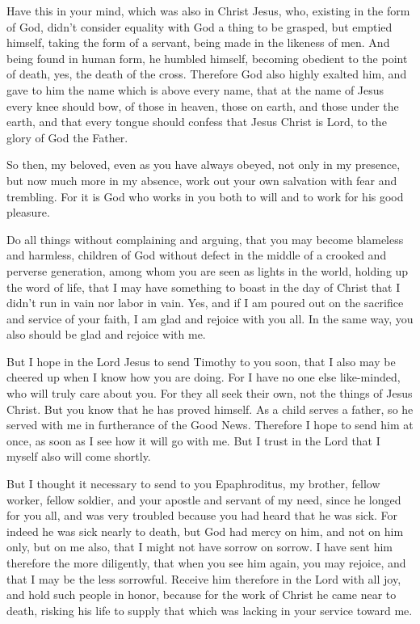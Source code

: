  Have this in your mind, which was also in Christ Jesus,
 who, existing in the form of God, didn't consider equality
with God a thing to be grasped,  but emptied himself, taking
the form of a servant, being made in the likeness of men. 
And being found in human form, he humbled himself, becoming obedient to
the point of death, yes, the death of the cross.  Therefore
God also highly exalted him, and gave to him the name which is above
every name,  that at the name of Jesus every knee should
bow, of those in heaven, those on earth, and those under the earth,
 and that every tongue should confess that Jesus Christ is
Lord, to the glory of God the Father.

 So then, my beloved, even as you have always obeyed, not
only in my presence, but now much more in my absence, work out your own
salvation with fear and trembling.  For it is God who works
in you both to will and to work for his good pleasure.

 Do all things without complaining and arguing,
 that you may become blameless and harmless, children of
God without defect in the middle of a crooked and perverse generation,
among whom you are seen as lights in the world,  holding up
the word of life, that I may have something to boast in the day of
Christ that I didn't run in vain nor labor in vain.  Yes,
and if I am poured out on the sacrifice and service of your faith, I am
glad and rejoice with you all.  In the same way, you also
should be glad and rejoice with me.

 But I hope in the Lord Jesus to send Timothy to you soon,
that I also may be cheered up when I know how you are doing.
 For I have no one else like-minded, who will truly care
about you.  For they all seek their own, not the things of
Jesus Christ.  But you know that he has proved himself. As
a child serves a father, so he served with me in furtherance of the Good
News.  Therefore I hope to send him at once, as soon as I
see how it will go with me.  But I trust in the Lord that I
myself also will come shortly.

 But I thought it necessary to send to you Epaphroditus, my
brother, fellow worker, fellow soldier, and your apostle and servant of
my need,  since he longed for you all, and was very
troubled because you had heard that he was sick.  For
indeed he was sick nearly to death, but God had mercy on him, and not on
him only, but on me also, that I might not have sorrow on sorrow.
 I have sent him therefore the more diligently, that when
you see him again, you may rejoice, and that I may be the less
sorrowful.  Receive him therefore in the Lord with all joy,
and hold such people in honor,  because for the work of
Christ he came near to death, risking his life to supply that which was
lacking in your service toward me.

